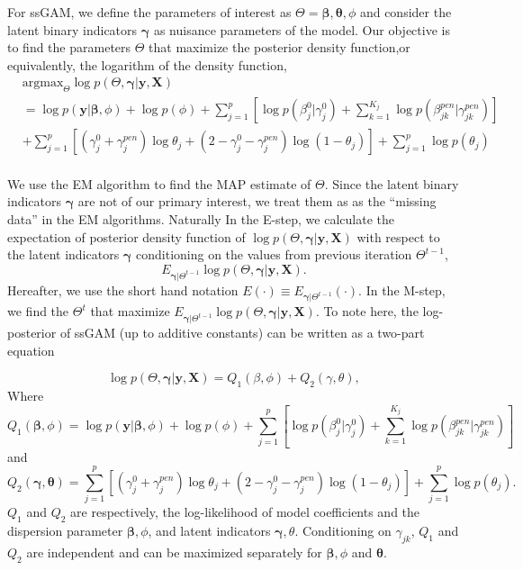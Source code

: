 \documentclass[AMA,STIX1COL,]{WileyNJD-v2}
\begin{document}
For ssGAM, we define the parameters of interest as
\(\Theta = {\boldsymbol{\beta}, \boldsymbol{\theta}, \phi}\) and
consider the latent binary indicators \(\boldsymbol{\gamma}\) as
nuisance parameters of the model. Our objective is to find the
parameters \(\Theta\) that maximize the posterior density function,or
equivalently, the logarithm of the density function, \[
\begin{aligned}
& \text{argmax}_{\Theta}
\log p(\Theta, \boldsymbol{\gamma}| \textbf{y}, \textbf{X}) \\
&= \log p(\textbf{y}|\boldsymbol{\beta}, \phi) + \log p(\phi) + \sum\limits_{j=1}^p\left[\log p(\beta^0_j|\gamma^0_j)+\sum\limits_{k=1}^{K_j} \log p(\beta^{pen}_{jk}|\gamma^{pen}_{jk})\right]\\
& +\sum\limits_{j=1}^{p} \left[ (\gamma^0_j+\gamma_{j}^{pen})\log \theta_j + (2-\gamma^0_j-\gamma_{j}^{pen}) \log (1-\theta_j)\right] +  \sum\limits_{j=1}^{p}\log p(\theta_j)
\end{aligned}
\]\\

We use the EM algorithm to find the MAP estimate of \(\Theta\). Since
the latent binary indicators \(\boldsymbol{\gamma}\) are not of our
primary interest, we treat them as as the ``missing data'' in the EM
algorithms. Naturally In the E-step, we calculate the expectation of
posterior density function of
\(\log p(\Theta, \boldsymbol{\gamma}| \textbf{y}, \textbf{X})\) with
respect to the latent indicators \(\boldsymbol{\gamma}\) conditioning on
the values from previous iteration \(\Theta^{t-1}\), \[
E_{\boldsymbol{\gamma}|\Theta^{t-1}}\log p(\Theta, \boldsymbol{\gamma}| \textbf{y}, \textbf{X}) .
\] Hereafter, we use the short hand notation
\(E(\cdot)\equiv E_{\boldsymbol{\gamma}|\Theta^{t-1}}(\cdot)\). In the
M-step, we find the \(\Theta^{t}\) that maximize
\(E_{\boldsymbol{\gamma}|\Theta^{t-1}}\log p(\Theta, \boldsymbol{\gamma}| \textbf{y}, \textbf{X})\).
To note here, the log-posterior of ssGAM (up to additive constants) can
be written as a two-part equation

\[ \log p(\Theta, \boldsymbol{\gamma}| \textbf{y}, \textbf{X}) = Q_1(\beta, \phi) + Q_2 (\gamma,\theta),\]
Where
\[ Q_1(\boldsymbol{\beta}, \phi) = \log p(\textbf{y}|\boldsymbol{\beta}, \phi) + \log p(\phi) + \sum\limits_{j=1}^p\left[\log p(\beta^0_j|\gamma^0_j)+\sum\limits_{k=1}^{K_j} \log p(\beta^{pen}_{jk}|\gamma^{pen}_{jk})\right]\]
and \[
Q_2(\boldsymbol{\gamma},\boldsymbol{\theta}) = \sum\limits_{j=1}^{p} \left[ (\gamma^0_j+\gamma_{j}^{pen})\log \theta_j + (2-\gamma^0_j-\gamma_{j}^{pen}) \log (1-\theta_j)\right] +  \sum\limits_{j=1}^{p}\log p(\theta_j) .\]
\(Q_1\) and \(Q_2\) are respectively, the log-likelihood of model
coefficients and the dispersion parameter \(\boldsymbol{\beta}, \phi\),
and latent indicators \(\boldsymbol{\gamma}, \theta\). Conditioning on
\(\gamma_{jk}\), \(Q_1\) and \(Q_2\) are independent and can be
maximized separately for \(\boldsymbol{\beta}, \phi\) and
\(\boldsymbol{\theta}\).
\end{document}
